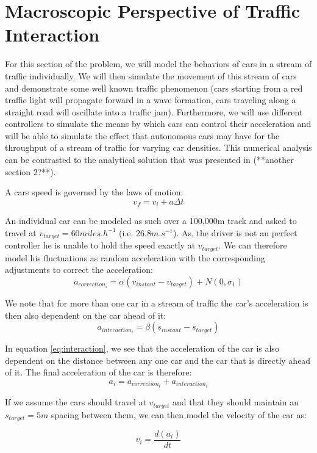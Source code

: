 \documentclass[11pt]{article}
\begin{document}
\section{Macroscopic Perspective of Traffic Interaction}
For this section of the problem, we will model the behaviors of cars in a stream of traffic individually. We will then simulate the movement of this stream of cars and demonstrate some well known traffic phenomenon (cars starting from a red traffic light will propagate forward in a wave formation, cars traveling along a straight road will oscillate into a traffic jam). Furthermore, we will use different controllers to simulate the means by which cars can control their acceleration and will be able to simulate the effect that autonomous cars may have for the throughput of a stream of traffic for varying car densities. This numerical analysis can be contrasted to the analytical solution that was presented in (**another section 2?**).\par
A cars speed is governed by the laws of motion:
\begin{equation}
v_f = v_i + a\Delta t
\end{equation}

An individual car can be modeled as such over a 100,000m track and asked to travel at $v_{target} = 60miles.h^{-1}$ (i.e. $26.8m.s^{-1}$). As, the driver is not an perfect controller he is unable to hold the speed exactly at $v_{target}$. We can therefore model his fluctuations as random acceleration with the corresponding adjustments to correct the acceleration:
\begin{equation}
a_{correction_i} = \alpha(v_{instant} - v_{target}) + N(0,\sigma_1)
\end{equation}

We note that for more than one car in a stream of traffic the car's acceleration is then also dependent on the car ahead of it:
\begin{equation}\label{eq:interaction}
a_{interaction_i} = \beta (s_{instant} - s_{target})
\end{equation}

In equation \ref{eq:interaction}, we see that the acceleration of the car is also dependent on the distance between any one car and the car that is directly ahead of it. The final acceleration of the car is therefore:
\begin{equation}\label{eq:acceleration}
a_{i} = a_{correction_i} + a_{interaction_i}
\end{equation}

If we assume the cars should travel at $v_{target}$ and that they should maintain an $s_{target} = 5m$ spacing between them, we can then model the velocity of the car as:

\begin{equation}\label{eq:velocity}
v_{i} = \frac{d(a_i)}{dt}
\end{equation}
\end{document}
